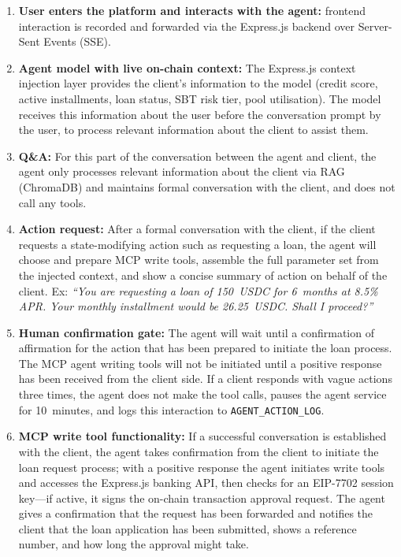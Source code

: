 \begin{enumerate}[noitemsep]
\item \textbf{User enters the platform and interacts with the agent:} frontend interaction is recorded and forwarded via the Express.js backend over Server-Sent Events (SSE).
\item \textbf{Agent model with live on-chain context:} The Express.js context injection layer provides the client's information to the model (credit score, active installments, loan status, SBT risk tier, pool utilisation). The model receives this information about the user before the conversation prompt by the user, to process relevant information about the client to assist them.
\item \textbf{Q\&A:} For this part of the conversation between the agent and client, the agent only processes relevant information about the client via RAG (ChromaDB) and maintains formal conversation with the client, and does not call any tools.
\item \textbf{Action request:} After a formal conversation with the client, if the client requests a state-modifying action such as requesting a loan, the agent will choose and prepare MCP write tools, assemble the full parameter set from the injected context, and show a concise summary of action on behalf of the client. Ex: \emph{``You are requesting a loan of 150~USDC for 6~months at 8.5\% APR. Your monthly installment would be 26.25~USDC. Shall I proceed?''}
\item \textbf{Human confirmation gate:} The agent will wait until a confirmation of affirmation for the action that has been prepared to initiate the loan process. The MCP agent writing tools will not be initiated until a positive response has been received from the client side. If a client responds with vague actions three times, the agent does not make the tool calls, pauses the agent service for 10~minutes, and logs this interaction to \texttt{AGENT\_ACTION\_LOG}.
\item \textbf{MCP write tool functionality:} If a successful conversation is established with the client, the agent takes confirmation from the client to initiate the loan request process; with a positive response the agent initiates write tools and accesses the Express.js banking API, then checks for an EIP-7702 session key---if active, it signs the on-chain transaction approval request. The agent gives a confirmation that the request has been forwarded and notifies the client that the loan application has been submitted, shows a reference number, and how long the approval might take.
\end{enumerate}

